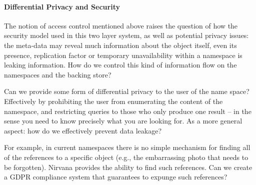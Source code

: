




\paragraph{Differential Privacy and Security}
The notion of access control mentioned above raises the question of how the security model used in this two layer system, as well as potential privacy issues: the meta-data may reveal much information about the object itself, even its presence, replication factor or temporary unavailability within a namespace is leaking information. How do we control this kind of information flow on the namespaces and the backing store?

Can we provide some form of differential privacy to the user of the name space? Effectively by prohibiting the user from enumerating the content of the namespace, and restricting queries to those who only produce one result -- in the sense you need to know precisely what you are looking for. As a more general aspect: how do we effectively prevent data leakage?

For example, in current namespaces there is no simple mechanism for finding all of the references to a specific object (e.g., the embarrassing photo that needs to be forgotten).
Nirvana provides the ability to find such references.  Can we create a GDPR compliance system that guarantees to expunge such references?


